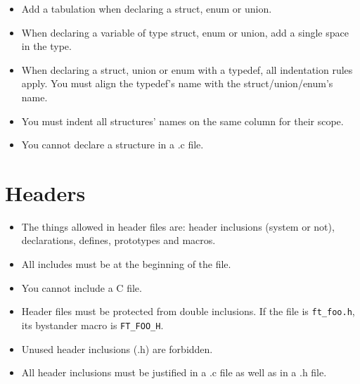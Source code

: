 \documentclass{42-ko}
\begin{document}
        \begin{itemize}

            \item Add a tabulation when declaring a struct, enum or union.

            \item When declaring a variable of type struct, enum or union,
                add a single space in the type.

            \item When declaring a struct, union or enum with a typedef,
                all indentation rules apply. You must align the typedef's name
                with the struct/union/enum's name.

            \item You must indent all structures' names on the same column for their scope.

            \item You cannot declare a structure in a .c file.

        \end{itemize}
        \newpage


    \section{Headers}

        \begin{itemize}

            \item The things allowed in header files are:
                header inclusions (system or not), declarations, defines,
                prototypes and macros.

            \item All includes must be at the beginning of the file.

            \item You cannot include a C file.

            \item Header files must be protected from double inclusions. If the file is
            \texttt{ft\_foo.h}, its bystander macro is \texttt{FT\_FOO\_H}.

            \item Unused header inclusions (.h) are forbidden.

            \item All header inclusions must be justified in a .c file
                as well as in a .h file.

        \end{itemize}
\end{document}
